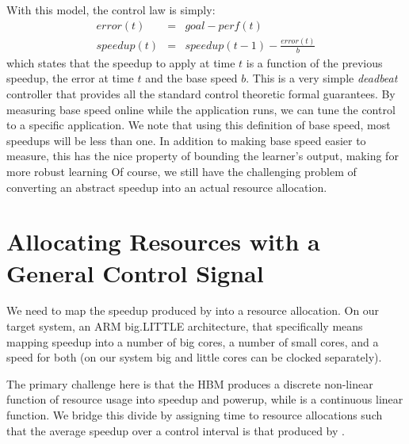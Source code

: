 With this model, the control law is simply:
\begin{eqnarray}
  error(t) &=& goal - perf(t) \label{eqn:speedup-error} \\
  speedup(t) &=& speedup(t-1) - \frac{error(t)}{b}
  \label{eqn:speedup-control}
\end{eqnarray}
which states that the speedup to apply at time $t$ is a function of
the previous speedup, the error at time $t$ and the base speed $b$.
This is a very simple \emph{deadbeat}  controller that provides
all the standard control theoretic formal guarantees.  By measuring
base speed online while the application runs, we can tune the control
to a specific application.  We note that using this definition of base
speed, most speedups will be less than one.  In addition to making
base speed easier to measure, this has the nice property of bounding
the learner's output, making for more robust learning 
Of course, we still have the challenging problem of converting an
abstract speedup into an actual resource allocation.


\section{Allocating Resources with a General Control Signal}
We need to map the speedup produced by  into a
resource allocation.  On our target system, an ARM big.LITTLE
architecture, that specifically means mapping speedup into a number of
big cores, a number of small cores, and a speed for both (on our
system big and little cores can be clocked separately).

The primary challenge here is that the HBM produces a discrete
non-linear function of resource usage into speedup and powerup, while
 is a continuous linear function.  We bridge
this divide by assigning time to resource allocations such that the
average speedup over a control interval is that produced by
.

